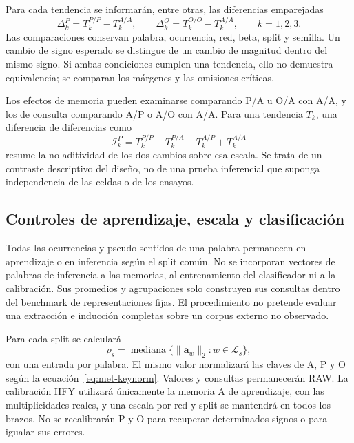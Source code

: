 Para cada tendencia se informarán, entre otras, las diferencias emparejadas
\begin{equation}
\Delta_k^{P}=T_k^{P/P}-T_k^{A/A},\qquad
\Delta_k^{O}=T_k^{O/O}-T_k^{A/A},\qquad k=1,2,3.
\label{eq:met-contrastes-control}
\end{equation}
Las comparaciones conservan palabra, ocurrencia, red, beta, split y semilla. Un cambio de signo esperado se distingue de un cambio de magnitud dentro del mismo signo. Si ambas condiciones cumplen una tendencia, ello no demuestra equivalencia; se comparan los márgenes y las omisiones críticas.

Los efectos de memoria pueden examinarse comparando P/A u O/A con A/A, y los de consulta comparando A/P o A/O con A/A. Para una tendencia $T_k$, una diferencia de diferencias como
\begin{equation}
\mathcal I_k^P=T_k^{P/P}-T_k^{P/A}-T_k^{A/P}+T_k^{A/A}
\label{eq:met-interaccion-control}
\end{equation}
resume la no aditividad de los dos cambios sobre esa escala. Se trata de un contraste descriptivo del diseño, no de una prueba inferencial que suponga independencia de las celdas o de los ensayos.

\subsection{Controles de aprendizaje, escala y clasificación}

Todas las ocurrencias y pseudo-sentidos de una palabra permanecen en aprendizaje o en inferencia según el split común. No se incorporan vectores de palabras de inferencia a las memorias, al entrenamiento del clasificador ni a la calibración. Sus promedios y agrupaciones solo construyen sus consultas dentro del benchmark de representaciones fijas. El procedimiento no pretende evaluar una extracción e inducción completas sobre un corpus externo no observado.

Para cada split se calculará
\begin{equation}
\rho_s=\operatorname{mediana}\{\|\mathbf a_w\|_2:w\in\mathcal L_s\},
\label{eq:met-rho-comun}
\end{equation}
con una entrada por palabra. El mismo valor normalizará las claves de A, P y O según la ecuación~\eqref{eq:met-keynorm}. Valores y consultas permanecerán RAW. La calibración HFY utilizará únicamente la memoria A de aprendizaje, con las multiplicidades reales, y una escala por red y split se mantendrá en todos los brazos. No se recalibrarán P y O para recuperar determinados signos o para igualar sus errores.

